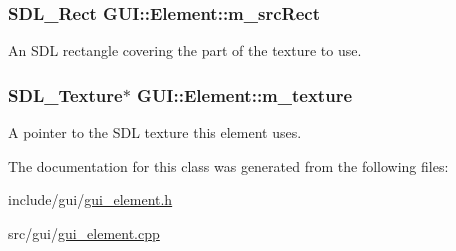 \hypertarget{classGUI_1_1Element_a7a4a307f67ce1e23f313791ba032dc77}{
\subsubsection[{m\-\_\-src\-Rect}]{\setlength{\rightskip}{0pt plus 5cm}S\-D\-L\-\_\-\-Rect G\-U\-I\-::\-Element\-::m\-\_\-src\-Rect\hspace{0.3cm}{\ttfamily [protected]}}}\label{classGUI_1_1Element_a7a4a307f67ce1e23f313791ba032dc77}


An S\-D\-L rectangle covering the part of the texture to use. 

\hypertarget{classGUI_1_1Element_a2e63212ae641d8af447d62ede6c2c831}{
\subsubsection[{m\-\_\-texture}]{\setlength{\rightskip}{0pt plus 5cm}S\-D\-L\-\_\-\-Texture$\ast$ G\-U\-I\-::\-Element\-::m\-\_\-texture\hspace{0.3cm}{\ttfamily [protected]}}}\label{classGUI_1_1Element_a2e63212ae641d8af447d62ede6c2c831}


A pointer to the S\-D\-L texture this element uses. 



The documentation for this class was generated from the following files\-:\begin{DoxyCompactItemize}
\item 
include/gui/\hyperlink{gui__element_8h}{gui\-\_\-element.\-h}\item 
src/gui/\hyperlink{gui__element_8cpp}{gui\-\_\-element.\-cpp}\end{DoxyCompactItemize}
